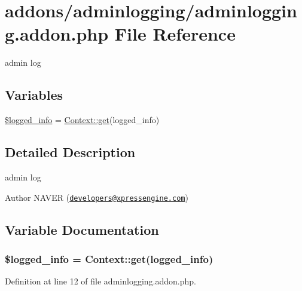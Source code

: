 \hypertarget{adminlogging_8addon_8php}{}\section{addons/adminlogging/adminlogging.addon.\+php File Reference}
\label{adminlogging_8addon_8php}


admin log  


\subsection*{Variables}
\begin{DoxyCompactItemize}
\item 
\hyperlink{adminlogging_8addon_8php_a193c1593ceb216e9fb05b0bad01ebbc8}{\$logged\+\_\+info} = \hyperlink{classContext_a90ce25d65fe6c9778421cbb36ab3def5}{Context\+::get}(\textquotesingle{}logged\+\_\+info\textquotesingle{})
\end{DoxyCompactItemize}


\subsection{Detailed Description}
admin log 

\begin{DoxyAuthor}{Author}
N\+A\+V\+ER (\href{mailto:developers@xpressengine.com}{\tt developers@xpressengine.\+com}) 
\end{DoxyAuthor}


\subsection{Variable Documentation}
\subsubsection[{\texorpdfstring{\$logged\+\_\+info}{$logged_info}}]{\setlength{\rightskip}{0pt plus 5cm}\$logged\+\_\+info = {\bf Context\+::get}(\textquotesingle{}logged\+\_\+info\textquotesingle{})}\hypertarget{adminlogging_8addon_8php_a193c1593ceb216e9fb05b0bad01ebbc8}{}\label{adminlogging_8addon_8php_a193c1593ceb216e9fb05b0bad01ebbc8}


Definition at line 12 of file adminlogging.\+addon.\+php.

